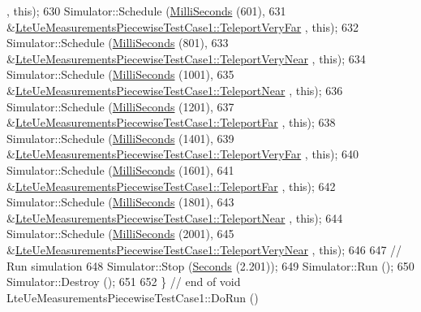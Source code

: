 \begin{DoxyCode}
      , \textcolor{keyword}{this});
630   Simulator::Schedule (\hyperlink{group__timecivil_gaf26127cf4571146b83a92ee18679c7a9}{MilliSeconds} (601),
631                        &\hyperlink{classLteUeMeasurementsPiecewiseTestCase1_a2ccd01a6f426d9cc34b5322c596c7eab}{LteUeMeasurementsPiecewiseTestCase1::TeleportVeryFar}
      , \textcolor{keyword}{this});
632   Simulator::Schedule (\hyperlink{group__timecivil_gaf26127cf4571146b83a92ee18679c7a9}{MilliSeconds} (801),
633                        &\hyperlink{classLteUeMeasurementsPiecewiseTestCase1_aa8faf751ec74daa2d3b81cb052a5e259}{LteUeMeasurementsPiecewiseTestCase1::TeleportVeryNear}
      , \textcolor{keyword}{this});
634   Simulator::Schedule (\hyperlink{group__timecivil_gaf26127cf4571146b83a92ee18679c7a9}{MilliSeconds} (1001),
635                        &\hyperlink{classLteUeMeasurementsPiecewiseTestCase1_ab7723a343f65e8f7cd903392a809da02}{LteUeMeasurementsPiecewiseTestCase1::TeleportNear}
      , \textcolor{keyword}{this});
636   Simulator::Schedule (\hyperlink{group__timecivil_gaf26127cf4571146b83a92ee18679c7a9}{MilliSeconds} (1201),
637                        &\hyperlink{classLteUeMeasurementsPiecewiseTestCase1_a9194b43ac2606b5ba1cd3d70f7b60a7d}{LteUeMeasurementsPiecewiseTestCase1::TeleportFar}
      , \textcolor{keyword}{this});
638   Simulator::Schedule (\hyperlink{group__timecivil_gaf26127cf4571146b83a92ee18679c7a9}{MilliSeconds} (1401),
639                        &\hyperlink{classLteUeMeasurementsPiecewiseTestCase1_a2ccd01a6f426d9cc34b5322c596c7eab}{LteUeMeasurementsPiecewiseTestCase1::TeleportVeryFar}
      , \textcolor{keyword}{this});
640   Simulator::Schedule (\hyperlink{group__timecivil_gaf26127cf4571146b83a92ee18679c7a9}{MilliSeconds} (1601),
641                        &\hyperlink{classLteUeMeasurementsPiecewiseTestCase1_a9194b43ac2606b5ba1cd3d70f7b60a7d}{LteUeMeasurementsPiecewiseTestCase1::TeleportFar}
      , \textcolor{keyword}{this});
642   Simulator::Schedule (\hyperlink{group__timecivil_gaf26127cf4571146b83a92ee18679c7a9}{MilliSeconds} (1801),
643                        &\hyperlink{classLteUeMeasurementsPiecewiseTestCase1_ab7723a343f65e8f7cd903392a809da02}{LteUeMeasurementsPiecewiseTestCase1::TeleportNear}
      , \textcolor{keyword}{this});
644   Simulator::Schedule (\hyperlink{group__timecivil_gaf26127cf4571146b83a92ee18679c7a9}{MilliSeconds} (2001),
645                        &\hyperlink{classLteUeMeasurementsPiecewiseTestCase1_aa8faf751ec74daa2d3b81cb052a5e259}{LteUeMeasurementsPiecewiseTestCase1::TeleportVeryNear}
      , \textcolor{keyword}{this});
646 
647   \textcolor{comment}{// Run simulation}
648   Simulator::Stop (\hyperlink{group__timecivil_ga33c34b816f8ff6628e33d5c8e9713b9e}{Seconds} (2.201));
649   Simulator::Run ();
650   Simulator::Destroy ();
651 
652 \} \textcolor{comment}{// end of void LteUeMeasurementsPiecewiseTestCase1::DoRun ()}
\end{DoxyCode}


